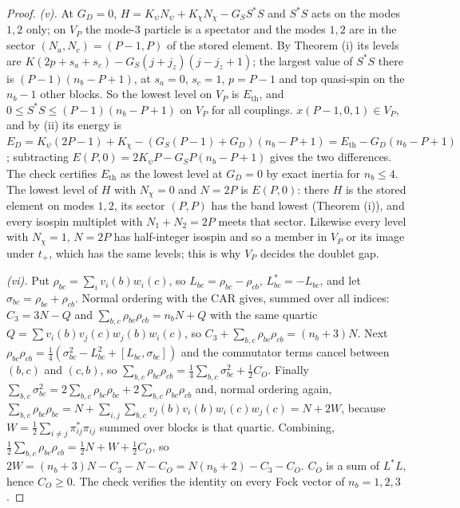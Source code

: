 \begin{proof}
\emph{(v).} At $G_{D} = 0$, $H = K_{\psi}N_{\psi} + K_{\chi}N_{\chi} - G_{S}S^{*}S$ and $S^{*}S$ acts on the modes $1, 2$ only; on $V_{P}$ the mode-$3$ particle is a spectator and the modes $1, 2$ are in the sector $(N_{a}, N_{c}) = (P - 1, P)$ of the stored element. By Theorem (i) its levels are $K(2p + s_{a} + s_{c}) - G_{S}(j + j_{z})(j - j_{z} + 1)$; the largest value of $S^{*}S$ there is $(P - 1)(n_{b} - P + 1)$, at $s_{a} = 0$, $s_{c} = 1$, $p = P - 1$ and top quasi-spin on the $n_{b} - 1$ other blocks. So the lowest level on $V_{P}$ is $E_{\mathrm{th}}$, and $0 \le S^{*}S \le (P - 1)(n_{b} - P + 1)$ on $V_{P}$ for all couplings. $x(P - 1, 0, 1) \in V_{P}$, and by (ii) its energy is $E_{D} = K_{\psi}(2P - 1) + K_{\chi} - (G_{S}(P - 1) + G_{D})(n_{b} - P + 1) = E_{\mathrm{th}} - G_{D}(n_{b} - P + 1)$; subtracting $E(P, 0) = 2K_{\psi}P - G_{S}P(n_{b} - P + 1)$ gives the two differences. The check certifies $E_{\mathrm{th}}$ as the lowest level at $G_{D} = 0$ by exact inertia for $n_{b} \le 4$. The lowest level of $H$ with $N_{\chi} = 0$ and $N = 2P$ is $E(P, 0)$: there $H$ is the stored element on modes $1, 2$, its sector $(P, P)$ has the band lowest (Theorem (i)), and every isospin multiplet with $N_{1} + N_{2} = 2P$ meets that sector. Likewise every level with $N_{\chi} = 1$, $N = 2P$ has half-integer isospin and so a member in $V_{P}$ or its image under $t_{+}$, which has the same levels; this is why $V_{P}$ decides the doublet gap.

\emph{(vi).} Put $\rho_{bc} = \sum_{i}v_{i}(b)w_{i}(c)$, so $L_{bc} = \rho_{bc} - \rho_{cb}$, $L_{bc}^{*} = -L_{bc}$, and let $\sigma_{bc} = \rho_{bc} + \rho_{cb}$. Normal ordering with the CAR gives, summed over all indices: $C_{3} = 3N - Q$ and $\sum_{b,c}\rho_{bc}\rho_{cb} = n_{b}N + Q$ with the same quartic $Q = \sum v_{i}(b)v_{j}(c)w_{j}(b)w_{i}(c)$, so $C_{3} + \sum_{b,c}\rho_{bc}\rho_{cb} = (n_{b} + 3)N$. Next $\rho_{bc}\rho_{cb} = \tfrac14(\sigma_{bc}^{2} - L_{bc}^{2} + [L_{bc}, \sigma_{bc}])$ and the commutator terms cancel between $(b, c)$ and $(c, b)$, so $\sum_{b,c}\rho_{bc}\rho_{cb} = \tfrac14\sum_{b,c}\sigma_{bc}^{2} + \tfrac12C_{O}$. Finally $\sum_{b,c}\sigma_{bc}^{2} = 2\sum_{b,c}\rho_{bc}\rho_{bc} + 2\sum_{b,c}\rho_{bc}\rho_{cb}$ and, normal ordering again, $\sum_{b,c}\rho_{bc}\rho_{bc} = N + \sum_{i,j}\sum_{b,c}v_{j}(b)v_{i}(b)w_{i}(c)w_{j}(c) = N + 2W$, because $W = \tfrac12\sum_{i \ne j}\pi_{ij}^{*}\pi_{ij}$ summed over blocks is that quartic. Combining, $\tfrac12\sum_{b,c}\rho_{bc}\rho_{cb} = \tfrac12N + W + \tfrac12C_{O}$, so $2W = (n_{b} + 3)N - C_{3} - N - C_{O} = N(n_{b} + 2) - C_{3} - C_{O}$. $C_{O}$ is a sum of $L^{*}L$, hence $C_{O} \ge 0$. The check verifies the identity on every Fock vector of $n_{b} = 1, 2, 3$.


\end{proof}
